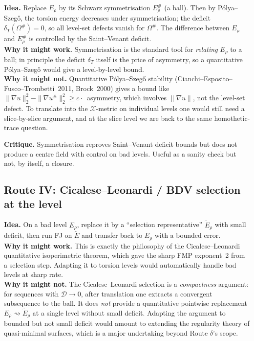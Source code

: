 \documentclass[11pt]{article}
\theoremstyle{definition}
\newcommand{\Om}{\Omega}
\newcommand{\X}{\mathcal X}
\newcommand{\dD}{\mathcal D}
\begin{document}
\textbf{Idea.}  Replace $E_{\rho}$ by its Schwarz symmetrisation
$E_{\rho}^{\#}$ (a ball).  Then by P\'olya--Szeg\H{o}, the torsion
energy decreases under symmetrisation; the deficit
$\delta_{T}(\Om^{\#})=0$, so all level-set defects vanish for
$\Om^{\#}$.  The difference between $E_{\rho}$ and $E_{\rho}^{\#}$ is
controlled by the Saint--Venant deficit.\\
\textbf{Why it might work.}  Symmetrisation is the standard tool for
\emph{relating} $E_{\rho}$ to a ball; in principle the deficit
$\delta_{T}$ itself is the price of asymmetry, so a quantitative
P\'olya--Szeg\H{o} would give a level-by-level bound.\\
\textbf{Why it might not.}  Quantitative P\'olya--Szeg\H{o} stability
(Cianchi--Esposito--Fusco--Trombetti~2011, Brock~2000) gives a bound
like $\|\nabla u\|_{2}^{2}-\|\nabla u^{\#}\|_{2}^{2}\ge c\cdot$~asymmetry,
which involves $\|\nabla u\|$, not the level-set defect.  To
translate into the $\X$-metric on individual levels one would still
need a slice-by-slice argument, and at the slice level we are back
to the same homothetic-trace question.

\textbf{Critique.}  Symmetrisation reproves Saint--Venant deficit
bounds but does not produce a centre field with control on bad
levels.  Useful as a sanity check but not, by itself, a closure.

\subsection{Route IV: Cicalese--Leonardi / BDV selection at the level}
\label{ssec:routeIV}

\textbf{Idea.}  On a bad level $E_{\rho}$, replace it by a ``selection
representative'' $\widetilde E_{\rho}$ with small deficit, then run
FJ on $\widetilde E$ and transfer back to $E_{\rho}$ with a bounded
error.\\
\textbf{Why it might work.}  This is exactly the philosophy of the
Cicalese--Leonardi quantitative isoperimetric theorem, which gave the
sharp FMP exponent~2 from a selection step.  Adapting it to torsion
levels would automatically handle bad levels at sharp rate.\\
\textbf{Why it might not.}  The Cicalese--Leonardi selection is a
\emph{compactness} argument: for sequences with $\dD\to 0$, after
translation one extracts a convergent subsequence to the ball.  It
does \emph{not} provide a quantitative pointwise replacement
$E_{\rho}\rightsquigarrow\widetilde E_{\rho}$ at a single level
without small deficit.  Adapting the argument to bounded but not
small deficit would amount to extending the regularity theory of
quasi-minimal surfaces, which is a major undertaking beyond Route
$\delta$'s scope.
\end{document}
